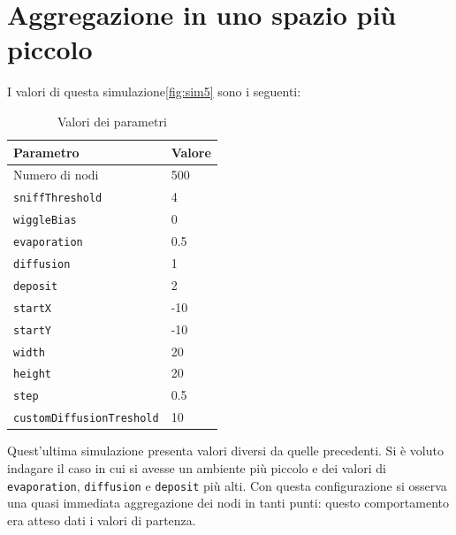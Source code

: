 \section{Aggregazione in uno spazio più piccolo}\label{sim5}
I valori di questa simulazione\space \cref{fig:sim5} sono i seguenti:
\begin{table}[ht]
    \centering
    \caption{Valori dei parametri}
    \begin{tabular}{ll}
        \hline
        Parametro                   & Valore \\
        \hline
        Numero di nodi              & 500    \\
        \texttt{sniffThreshold}     & 4      \\
        \texttt{wiggleBias}         & 0      \\
        \texttt{evaporation}        & 0.5    \\
        \texttt{diffusion}          & 1 \\
        \texttt{deposit}            & 2      \\
        \texttt{startX}             & -10    \\
        \texttt{startY}             & -10    \\
        \texttt{width}              & 20     \\
        \texttt{height}             & 20     \\
        \texttt{step}               & 0.5    \\
        \texttt{customDiffusionTreshold} & 10 \\
        \hline
    \end{tabular}\label{tab:parametri5}
\end{table}\newline
Quest'ultima simulazione presenta valori diversi da quelle precedenti. Si è voluto indagare il caso
in cui si avesse un ambiente più piccolo e dei valori di \texttt{evaporation}, \texttt{diffusion} e \texttt{deposit} 
più alti. Con questa configurazione si osserva una quasi immediata aggregazione dei nodi in tanti punti: questo comportamento
era atteso dati i valori di partenza.


